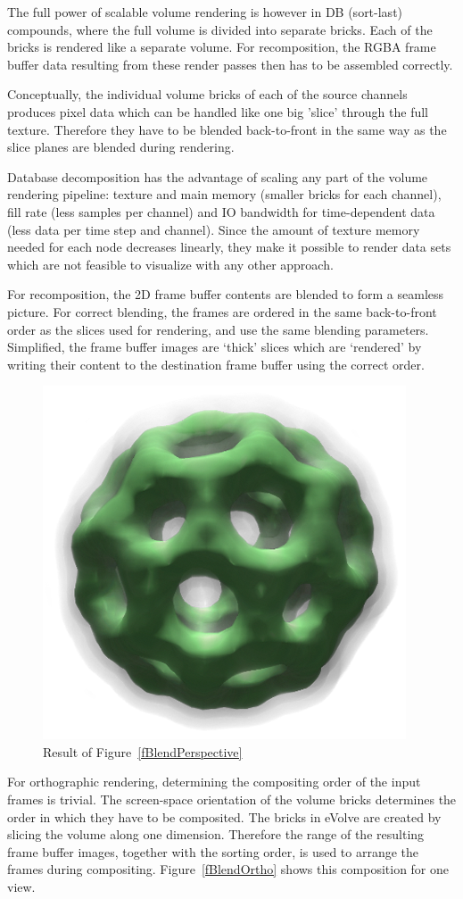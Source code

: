 \documentclass[10pt,a4]{scrartcl}
\newcommand{\fig}[1]{Figure~\ref{#1}}
\begin{document}
The full power of scalable volume rendering is however in DB (sort-last)
compounds, where the full volume is divided into separate bricks. Each
of the bricks is rendered like a separate volume. For recomposition, the
\textsf{RGBA} frame buffer data resulting from these render passes then
has to be assembled correctly. 

Conceptually, the individual volume bricks of each of the source
channels produces pixel data which can be handled like one big 'slice'
through the full texture. Therefore they have to be blen\-ded
back-to-front in the same way as the slice planes are blended during
rendering.

Database decomposition has the advantage of scaling any part of the volume
rendering pipeline: texture and main memory (smaller bricks for each channel),
fill rate (less samples per channel) and IO bandwidth for time-dependent data
(less data per time step and channel). Since the amount of texture memory needed
for each node decreases linearly, they make it possible to render data sets
which are not feasible to visualize with any other approach.

For recomposition, the 2D frame buffer contents are blended to form a
seamless picture. For correct blending, the frames are ordered in the
same back-to-front order as the slices used for rendering, and use the
same blending parameters. Simplified, the frame buffer images are
`thick' slices which are `rendered' by writing their content to the
destination frame buffer using the correct order.

\begin{figure}
  \includegraphics[width=.382\textwidth]{images/volResult.png}
  {\caption{\label{fVolResult}Result of \fig{fBlendPerspective}}}
\end{figure}
For orthographic rendering, determining the compositing order of the
input frames is trivial. The screen-space orientation of the volume
bricks determines the order in which they have to be composited. The
bricks in \textsf{eVolve} are created by slicing the volume along one
dimension. Therefore the range of the resulting frame buffer images,
together with the sorting order, is used to arrange the frames during
compositing. \fig{fBlendOrtho} shows this composition for one view.
\end{document}
